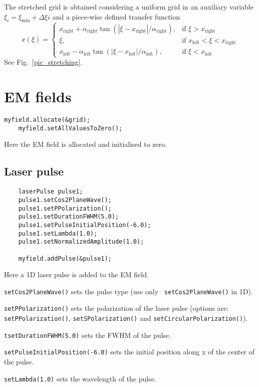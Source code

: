 \documentclass[11pt,a4paper]{report}
\begin{document}
The stretched grid is obtained considering a uniform grid in an
auxiliary variable $\xi_i=\xi_{\min}+\Delta\xi i$ and a piece-wise defined transfer function
\[
x(\xi) =
\begin{cases}
x_{\text{right}}+\alpha_{\text{right}} \tan\left(
\left|\xi-x_{\text{right}}\right|/\alpha_{\text{right}}\right), & \text{if } \xi>x_{\text{right}}\\
\xi, & \text{if }x_{\text{left}}<\xi<x_{\text{right}}\\
x_{\text{left}}-\alpha_{\text{left}} \tan\left(
\left|\xi-x_{\text{left}}\right|/\alpha_{\text{left}}\right), & \text{if } \xi<x_{\text{left}}
\end{cases}
\]
See Fig.~\ref{pic_stretching}.


\section{EM fields}
\begin{lstlisting}[backgroundcolor=\color{no_modify}]
	myfield.allocate(&grid);
	myfield.setAllValuesToZero();
\end{lstlisting}
Here the EM field is allocated and initialised to zero.
\subsection{Laser pulse}

\begin{lstlisting}
	laserPulse pulse1;
	pulse1.setCos2PlaneWave();
   	pulse1.setPPolarization();
   	pulse1.setDurationFWHM(5.0);
   	pulse1.setPulseInitialPosition(-6.0);
   	pulse1.setLambda(1.0);
   	pulse1.setNormalizedAmplitude(1.0);

	myfield.addPulse(&pulse1);
\end{lstlisting}
Here a 1D laser pulse is added to the EM field.

\verb+setCos2PlaneWave()+ sets the pulse type (use only \verb+ setCos2PlaneWave()+ in 1D).

\verb+setPPolarization()+ sets the polarization of the laser pulse (options are: \texttt{setPPolarization()}, \texttt{setSPolarization()} and \texttt{setCircularPolarization()}).

\verb+tsetDurationFWHM(5.0)+ sets the FWHM of the pulse.

\verb+setPulseInitialPosition(-6.0)+ sets the initial position along x of the center of the pulse.

\verb+setLambda(1.0)+ sets the wavelength of the pulse.
\end{document}
